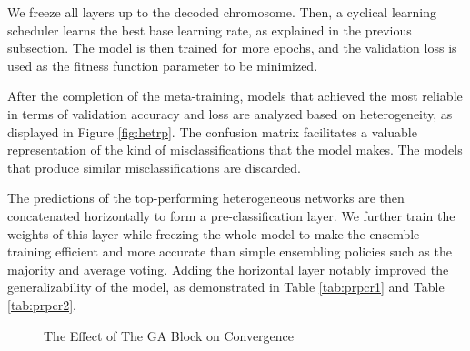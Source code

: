 \documentclass[a4paper, 12 pt, conference]{ieeeconf}
\begin{document}
\quad We freeze all layers up to the decoded chromosome. Then, a cyclical learning scheduler learns the best base learning rate, as explained in the previous subsection. The model is then trained for more epochs, and the validation loss is used as the fitness function parameter to be minimized.

After the completion of the meta-training, models that achieved the most reliable in terms of validation accuracy and loss are analyzed based on heterogeneity, as displayed in Figure \ref{fig:hetrp}. The confusion matrix facilitates a valuable representation of the kind of misclassifications that the model makes. The models that produce similar misclassifications are discarded.

\quad The predictions of the top-performing heterogeneous networks are then concatenated horizontally to form a pre-classification layer. We further train the weights of this layer while freezing the whole model to make the ensemble training efficient and more accurate than simple ensembling policies such as the majority and average voting. Adding the horizontal layer notably improved the generalizability of the model, as demonstrated in Table \ref{tab:prpcr1} and Table \ref{tab:prpcr2}.
\begin{figure}[htbp]
    \centering
    \hfill%
    \caption{The Effect of The GA Block on Convergence}
\end{figure}
\end{document}
